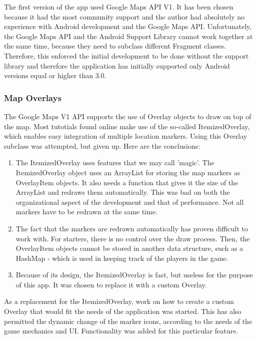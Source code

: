 The first version of the app used Google Maps API V1. It has been chosen
because it had the most community support and the author had absolutely no
experience with Android development and the Google Maps API.  Unfortunately, the
Google Maps API and the Android Support Library cannot work together at the same
time, because they need to subclass different Fragment classes. Therefore, this
enforced the initial development to be done without the support library and
therefore the application has initially supported only Android versions equal or
higher than 3.0.

\subsubsection{Map Overlays}

The Google Maps V1 API supports the use of Overlay objects to draw on top
of the map. Most tutotials found online make use of the so-called
ItemizedOverlay, which enables easy integration of multiple location markers.
Using this Overlay subclass was attempted, but given up. Here are the
conclusions: \newline
\begin{enumerate}
  \item The ItemizedOverlay uses features that we may call 'magic'. The
  ItemizedOverlay object uses an ArrayList for storing the map markers as
  OverlayItem objects. It also needs a function that gives it the size of the
  ArrayList and redraws them automatically. This was bad on both the
  organizational aspect of the development and that of performance. Not all
  markers have to be redrawn at the same time.
  
  \item The fact that the markers are redrawn automatically has proven difficult
  to work with. For starters, there is no control over the draw process. Then,
  the OverlayItem objects cannot be stored in another data structure, such as a
  HashMap - which is used in keeping track of the players in the game.
  
  \item Because of its design, the ItemizedOverlay is fast, but useless for the
  purpose of this app. It was chosen to replace it with a custom Overlay.   
\end{enumerate}

As a replacement for the ItemizedOverlay, work on how to create a custom Overlay
that would fit the needs of the application was started. This has also permitted
the dynamic change of the marker icons, according to the needs of the game
mechanics and UI. Functionality was added for this particular feature. \newline

